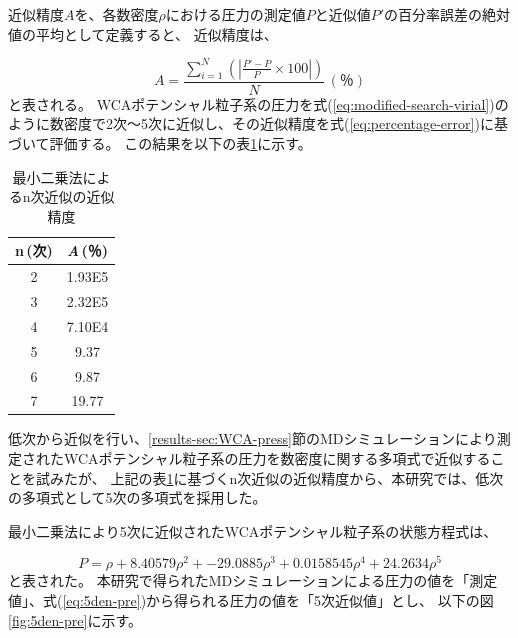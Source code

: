 \documentclass[titlepage]{jsreport}
\begin{document}
{{{近似精度$A$を、各数密度$\rho$における圧力の測定値$P$と近似値$P'$の百分率誤差の絶対値の平均として定義すると、
近似精度は、

\large
\begin{equation}
    A=\frac{\sum_{i=1}^N\left(|\frac{P'-P}{P}\times100|\right)}{N}\,(％)\label{eq:percentage-error}
\end{equation}
\normalsize
と表される。
WCAポテンシャル粒子系の圧力を式(\ref{eq:modified-search-virial})のように数密度で2次〜5次に近似し、その近似精度を式(\ref{eq:percentage-error})に基づいて評価する。
この結果を以下の表\ref{table:approximation-accuracy}に示す。

\begin{table}[htbp]
    \begin{center}
        \caption{最小二乗法によるn次近似の近似精度}
            \begin{tabular}{c c}
               
                    n\,(次) & {\it{A}}\,(％) \\ \hline\hline
                    2 & 1.93E5 \\ 
                    3 & 2.32E5 \\ 
                    4 & 7.10E4\\ 
                    5 & 9.37\\ 
                    6 & 9.87 \\ 
                    7 & 19.77 \\ \hline
                
            \end{tabular}
    \end{center}
    \label{table:approximation-accuracy}
\end{table}

\newpage
低次から近似を行い、\ref{results-sec:WCA-press}節のMDシミュレーションにより測定されたWCAポテンシャル粒子系の圧力を数密度に関する多項式で近似することを試みたが、
上記の表\ref{table:approximation-accuracy}に基づくn次近似の近似精度から、本研究では、低次の多項式として5次の多項式を採用した。

最小二乗法により5次に近似されたWCAポテンシャル粒子系の状態方程式は、

\large
\begin{equation}
    P=\rho+8.40579\rho^2+-29.0885\rho^3+0.0158545\rho^4+24.2634\rho^5 \label{eq:5den-pre}
\end{equation}
\normalsize
と表された。
本研究で得られたMDシミュレーションによる圧力の値を「測定値」、式(\ref{eq:5den-pre})から得られる圧力の値を「5次近似値」とし、
以下の図\ref{fig:5den-pre}に示す。

}}}
\end{document}
